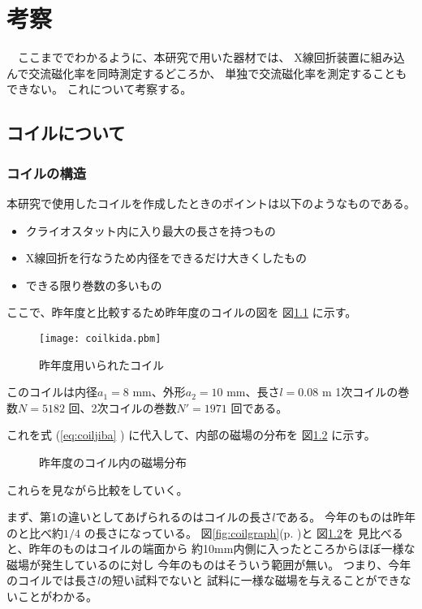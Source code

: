 \chapter{考察}

　ここまででわかるように、本研究で用いた器材では、
X線回折装置に組み込んで交流磁化率を同時測定するどころか、
単独で交流磁化率を測定することもできない。
これについて考察する。

\section{コイルについて}\label{sec:coil}

\subsection{コイルの構造}\label{subsec:コイル構造}
本研究で使用したコイルを作成したときのポイントは以下のようなものである。

\begin{itemize}
	\item クライオスタット内に入り最大の長さを持つもの
	\item X線回折を行なうため内径をできるだけ大きくしたもの
	\item できる限り巻数の多いもの
\end{itemize}

ここで、昨年度と比較するため昨年度のコイルの図を
図\ref{fig:kida_coil} に示す。

\begin{figure}[htb]
	\begin{center}
	\texttt{[image: coilkida.pbm]}
	\end{center}
	\caption{昨年度用いられたコイル}
	\label{fig:kida_coil}
\end{figure}

このコイルは内径$a_1=8$ mm、外形$a_2=10$ mm、長さ$l=0.08$ m 
1次コイルの巻数$N=5182$ 回、2次コイルの巻数$N'=1971$ 回である。

これを式 (\ref{eq:coiljiba} ) に代入して、内部の磁場の分布を
図\ref{fig:coilgraphkida} に示す。

\begin{figure}[htb]
	\begin{center}
	
	\end{center}
	\caption{昨年度のコイル内の磁場分布}
	\label{fig:coilgraphkida}
\end{figure}
これらを見ながら比較をしていく。

まず、第1の違いとしてあげられるのはコイルの長さ$l$である。
今年のものは昨年のと比べ約$1/4$ の長さになっている。
図\ref{fig:coilgraph}(p. \pageref{fig:coilgraph})と
図\ref{fig:coilgraphkida}を
見比べると、昨年のものはコイルの端面から
約10mm内側に入ったところからほぼ一様な磁場が発生しているのに対し
今年のものはそういう範囲が無い。
つまり、今年のコイルでは長さ$l$の短い試料でないと
試料に一様な磁場を与えることができないことがわかる。

